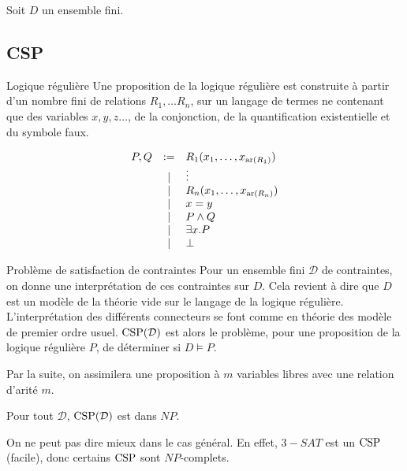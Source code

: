 
Soit $D$ un ensemble fini.

\subsection{CSP}

\begin{defi}{Logique régulière}
    Une proposition de la logique régulière est construite à partir d'un nombre
    fini de relations $R_1, \dots R_n$, sur un langage de termes ne contenant que
    des variables $x, y, z \dots$, de la conjonction, de la quantification existentielle
    et du symbole faux.

    \[\begin{array}{rcl}
        P, Q & := & R_1(x_1, \dots, x_{\text{ar}(R_1)}) \\
             & |  & \vdots                        \\
             & |  & R_n(x_1, \dots, x_{\text{ar}(R_n)}) \\
             & |  & x = y                         \\
             & |  & P \wedge Q                    \\
             & |  & \exists x. P                  \\
             & |  & \bot                          \\
    \end{array}\]
\end{defi}

\begin{defi}{Problème de satisfaction de contraintes}
    Pour un ensemble fini $\mathcal{D}$ de contraintes, on donne une interprétation de
    ces contraintes sur $D$. Cela revient à dire que $D$ est un modèle de la théorie
    vide sur le langage de la logique régulière. L'interprétation des différents 
    connecteurs se font comme en théorie des modèle de premier ordre usuel. 
    $\text{CSP}(\mathcal{D})$ est alors le problème, pour une proposition de la logique
    régulière $P$, de déterminer si $D\models P$.
\end{defi}

Par la suite, on assimilera une proposition à $m$ variables libres avec une relation
d'arité $m$.

\begin{lem}
    Pour tout $\mathcal{D}$, $\text{CSP}(\mathcal{D})$ est dans $NP$.

    On ne peut pas dire mieux dans le cas général. En effet, $3-SAT$ est un $\text{CSP}$
    (facile), donc certains $\text{CSP}$ sont $NP$-complets.
\end{lem}

